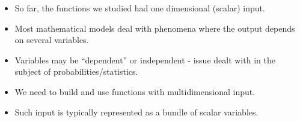 \begin{frame}
\begin{itemize}
\item So far, the functions we studied had  one dimensional (scalar) input.
\item<2-> Most mathematical models deal with phenomena where the output
depends on several variables.
\item<3-> Variables may be ``dependent'' or independent - issue dealt with in the subject of probabilities/statistics.
\item<4-> We need to build and use functions with multidimensional input.
\item<5-> Such input is typically represented as a bundle of scalar variables.
\end{itemize}

\end{frame}